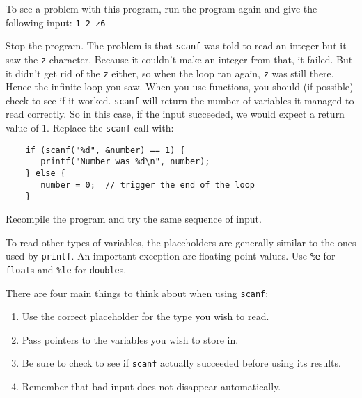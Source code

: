 To see a problem with this program, run the program again and give the following input:
\texttt{1 2 z6}

Stop the program.
The problem is that \texttt{scanf} was told to read an integer but it saw the \texttt{z} character.
Because it couldn't make an integer from that, it failed.
But it didn't get rid of the \texttt{z} either, so when the loop ran again, \texttt{z} was still there.
Hence the infinite loop you saw.
When you use functions, you should (if possible) check to see if it worked.
\texttt{scanf} will return the number of variables it managed to read correctly.
So in this case, if the input succeeded, we would expect a return value of $1$.
Replace the \texttt{scanf} call with:
\begin{lstlisting}
    if (scanf("%d", &number) == 1) {
       printf("Number was %d\n", number); 
    } else {
       number = 0;	// trigger the end of the loop
    }
\end{lstlisting}

Recompile the program and try the same sequence of input.

To read other types of variables, the placeholders are generally similar to the ones used by \texttt{printf}.
An important exception are floating point values.
Use \texttt{\%e} for \texttt{float}s and \texttt{\%le} for \texttt{double}s.


There are four main things to think about when using \texttt{scanf}:
\begin{enumerate}
 \item Use the correct placeholder for the type you wish to read.
 \item Pass pointers to the variables you wish to store in.
 \item Be sure to check to see if \texttt{scanf} actually succeeded
 before using its results.
 \item Remember that bad input does not disappear automatically.
\end{enumerate}
